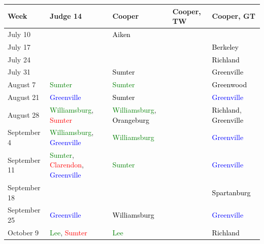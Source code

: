 \documentclass[11pt]{article}
\newcommand{\rowgroup}[1]{\hspace{-1em}#1}
\theoremstyle{ModifiedStyle}
\begin{document}
    \begin{table}[H]
    	\centering
    	\vspace{-11mm}
    	\hspace*{-16mm}
    	\setlength\tabcolsep{0pt} %
    	{\footnotesize
    		\begin{tabular}{L{23mm}C{55mm}C{38mm}C{38mm}C{38mm}}
    			\hline
    			\rule{0pt}{2.3ex} Week & Judge 14 & Cooper & Cooper, TW & Cooper, GT \\
    			\hline
    			\rule{0pt}{2.3ex} July 10 & & \textcolor{black}{Aiken} & &\\
    			\rule{0pt}{2.3ex} July 17 & & & &  \textcolor{black}{Berkeley}\\\rule{0pt}{2.3ex} July 24 & & & &  \textcolor{black}{Richland}\\
    			\rule{0pt}{2.3ex} July 31 & & \textcolor{black}{Sumter} & &  \textcolor{black}{Greenville}\\\rule{0pt}{2.3ex} August 7 &  \textcolor{green}{Sumter} & \textcolor{green}{Sumter} & &  \textcolor{black}{Greenwood}\\
    			\rule{0pt}{2.3ex} August 21 &  \textcolor{blue}{Greenville} & \textcolor{black}{Sumter} & &  \textcolor{blue}{Greenville}\\
    			\rule{0pt}{2.3ex} August 28 &  \textcolor{green}{Williamsburg}, \textcolor{red}{Sumter} & \textcolor{green}{Williamsburg}, \textcolor{black}{Orangeburg} & &  \textcolor{black}{Richland}, \textcolor{black}{Greenville}\\
    			\rule{0pt}{2.3ex} September 4 &  \textcolor{green}{Williamsburg}, \textcolor{blue}{Greenville} & \textcolor{green}{Williamsburg} & &  \textcolor{blue}{Greenville}\\
    			\rule{0pt}{2.3ex} September 11 &  \textcolor{green}{Sumter}, \textcolor{red}{Clarendon}, \textcolor{blue}{Greenville} & \textcolor{green}{Sumter} & &  \textcolor{blue}{Greenville}\\
    			\rule{0pt}{2.3ex} September 18 & & & &  \textcolor{black}{Spartanburg}\\
    			\rule{0pt}{2.3ex} September 25 &  \textcolor{blue}{Greenville} & \textcolor{black}{Williamsburg} & &  \textcolor{blue}{Greenville}\\
    			\rule{0pt}{2.3ex} October 9 &  \textcolor{green}{Lee}, \textcolor{red}{Sumter} & \textcolor{green}{Lee} & &  \textcolor{black}{Richland}\\

\end{tabular}}
\end{table}
\end{document}
